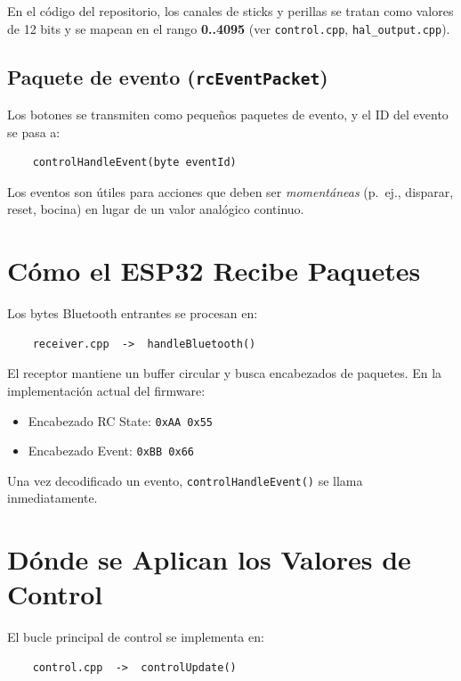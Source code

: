 En el código del repositorio, los canales de sticks y perillas se tratan como valores de 12 bits y se mapean en el
rango \textbf{0..4095} (ver \texttt{control.cpp}, \texttt{hal\_output.cpp}).

\subsection{Paquete de evento (\texttt{rcEventPacket})}
Los botones se transmiten como pequeños paquetes de evento, y el ID del evento se pasa a:

\begin{verbatim}
    controlHandleEvent(byte eventId)
\end{verbatim}

Los eventos son útiles para acciones que deben ser \emph{momentáneas} (p.\ ej., disparar, reset, bocina) en lugar de un
valor analógico continuo.

\section{Cómo el ESP32 Recibe Paquetes}
\label{sec:receiver}

Los bytes Bluetooth entrantes se procesan en:

\begin{verbatim}
    receiver.cpp  ->  handleBluetooth()
\end{verbatim}

El receptor mantiene un buffer circular y busca encabezados de paquetes.
En la implementación actual del firmware:

\begin{itemize}
    \item Encabezado RC State: \texttt{0xAA 0x55}
    \item Encabezado Event: \texttt{0xBB 0x66}
\end{itemize}

Una vez decodificado un evento, \texttt{controlHandleEvent()} se llama inmediatamente.

\section{Dónde se Aplican los Valores de Control}
\label{sec:control-layer}

El bucle principal de control se implementa en:

\begin{verbatim}
    control.cpp  ->  controlUpdate()
\end{verbatim}

